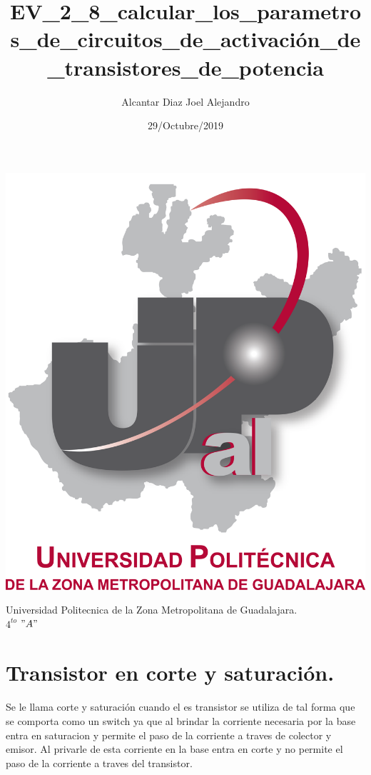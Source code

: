\documentclass[letterpaper]{article}
\title{EV\_2\_8\_calcular\_los\_parametros\_de\_circuitos\_de\_activación\_de\_transistores\_de\_potencia}
\author{Alcantar Diaz Joel Alejandro}
\date{29/Octubre/2019}
\begin{document}
\maketitle

\begin{center}
\vspace{2cm}
\includegraphics[scale=0.5]{UPZMGlog.png}\\
\vspace{2cm}
\begin{large}
    Universidad Politecnica de la Zona Metropolitana de Guadalajara.\\
    $4^{to}$ $"A"$
\end{large}
\end{center}

\newpage
\section{Transistor en corte y saturación.}
\begin{large}
    Se le llama corte y saturación cuando el es transistor se utiliza de tal forma que se comporta como un switch ya que al brindar la corriente necesaria por la base entra en saturacion y permite el paso de la corriente a traves de colector y emisor. Al privarle de esta corriente en la base entra en corte y no permite el paso de la corriente a traves del transistor.\\
\end{large}
\end{document}
